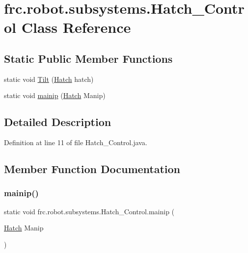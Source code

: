 \hypertarget{classfrc_1_1robot_1_1subsystems_1_1_hatch___control}{}\section{frc.\+robot.\+subsystems.\+Hatch\+\_\+\+Control Class Reference}
\label{classfrc_1_1robot_1_1subsystems_1_1_hatch___control}
\subsection*{Static Public Member Functions}
\begin{DoxyCompactItemize}
\item 
static void \hyperlink{classfrc_1_1robot_1_1subsystems_1_1_hatch___control_a10439efd71fc486d24b95364d70dcde3}{Tilt} (\hyperlink{enumfrc_1_1robot_1_1_enums_1_1_hatch}{Hatch} hatch)
\item 
static void \hyperlink{classfrc_1_1robot_1_1subsystems_1_1_hatch___control_a902c47bda22ebf4421953aafbc76128e}{mainip} (\hyperlink{enumfrc_1_1robot_1_1_enums_1_1_hatch}{Hatch} Manip)
\end{DoxyCompactItemize}


\subsection{Detailed Description}


Definition at line 11 of file Hatch\+\_\+\+Control.\+java.



\subsection{Member Function Documentation}
\mbox{\label{classfrc_1_1robot_1_1subsystems_1_1_hatch___control_a902c47bda22ebf4421953aafbc76128e}} 
\subsubsection{\texorpdfstring{mainip()}{mainip()}}
{\footnotesize\ttfamily static void frc.\+robot.\+subsystems.\+Hatch\+\_\+\+Control.\+mainip (\begin{DoxyParamCaption}\item[{\hyperlink{enumfrc_1_1robot_1_1_enums_1_1_hatch}{Hatch}}]{Manip }\end{DoxyParamCaption})\hspace{0.3cm}{\ttfamily [static]}}



